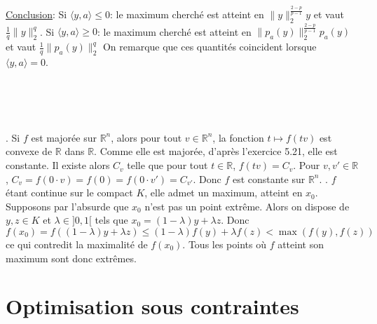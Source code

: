\documentclass{report}
\begin{document}
\underline{Conclusion}: \newline Si $\langle y,a \rangle\leq 0$: le maximum cherché est atteint en $\|y\|_2^{\frac{2-p}{p-1}}y$ et vaut $\frac{1}{q}\|y\|_2^q$.\newline
Si $\langle y,a \rangle\geq 0$: le maximum cherché est atteint en $\|p_a(y)\|_2^{\frac{2-p}{p-1}} p_a(y)$ et vaut $\frac{1}{q}\|p_a(y)\|_2^q$\newline
On remarque que ces quantités coincident lorsque $\langle y,a \rangle = 0$.

\subsection{} \noindent{}\\ 
\\ 
\\
. Si $f$ est majorée sur $\mathbb R^n$, alors pour tout $v\in \mathbb R^n$, la fonction $t\mapsto f(tv)$ est convexe de $\mathbb R$ dans $\mathbb R$. Comme elle est majorée, d'après l'exercice 5.21, elle est constante. Il existe alors $C_v$ telle que pour tout $t\in \mathbb R$, $f(tv)=C_v$.\newline
Pour $v,v' \in \mathbb R$, $C_v=f(0\cdot v)=f(0)=f(0\cdot v')=C_{v'}$. Donc $f$ est constante sur $\mathbb R^n$. \newline
{}. $f$ étant continue sur le compact $K$, elle admet un maximum, atteint en $x_0$. Supposons par l'absurde que $x_0$ n'est pas un point extrême. Alors on dispose de $y,z\in K$ et $\lambda\in ]0,1[$ tels que $x_0=(1-\lambda)y + \lambda z$. Donc 
$$f(x_0)=f((1-\lambda)y + \lambda z)\leq (1-\lambda)f(y) + \lambda f(z) < \max(f(y),f(z))$$ ce qui contredit la maximalité de $f(x_0)$. \newline
Tous les points où $f$ atteint son maximum sont donc extrêmes.\newline


\newpage
\section{Optimisation sous contraintes}
\end{document}
